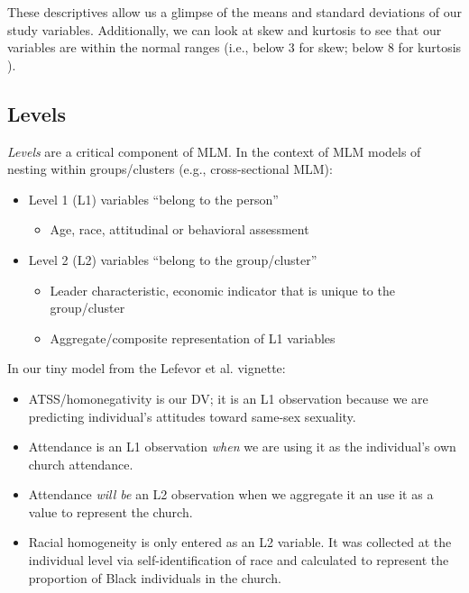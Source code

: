 \documentclass[
  11pt,
]{book}
\providecommand{\tightlist}{%
  \setlength{\itemsep}{0pt}\setlength{\parskip}{0pt}}
\begin{document}
These descriptives allow us a glimpse of the means and standard deviations of our study variables. Additionally, we can look at skew and kurtosis to see that our variables are within the normal ranges (i.e., below 3 for skew; below 8 for kurtosis \citep{kline_principles_2016}).

\hypertarget{levels}{%
\subsection{Levels}\label{levels}}

\emph{Levels} are a critical component of MLM. In the context of MLM models of nesting within groups/clusters (e.g., cross-sectional MLM):

\begin{itemize}
\tightlist
\item
  Level 1 (L1) variables ``belong to the person''

  \begin{itemize}
  \tightlist
  \item
    Age, race, attitudinal or behavioral assessment
  \end{itemize}
\item
  Level 2 (L2) variables ``belong to the group/cluster''

  \begin{itemize}
  \tightlist
  \item
    Leader characteristic, economic indicator that is unique to the group/cluster
  \item
    Aggregate/composite representation of L1 variables
  \end{itemize}
\end{itemize}

In our tiny model from the Lefevor et al. \citeyearpar{lefevor_homonegativity_2020} vignette:

\begin{itemize}
\tightlist
\item
  ATSS/homonegativity is our DV; it is an L1 observation because we are predicting individual's attitudes toward same-sex sexuality.
\item
  Attendance is an L1 observation \emph{when} we are using it as the individual's own church attendance.
\item
  Attendance \emph{will be } an L2 observation when we aggregate it an use it as a value to represent the church.
\item
  Racial homogeneity is only entered as an L2 variable. It was collected at the individual level via self-identification of race and calculated to represent the proportion of Black individuals in the church.
\end{itemize}
\end{document}
